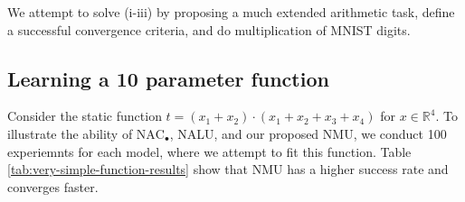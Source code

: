 We attempt to solve (i-iii) by proposing a much extended arithmetic task, define a successful convergence criteria, and do multiplication of MNIST digits.


\subsection{Learning a 10 parameter function}
Consider the static function $t = (x_1 + x_2) \cdot (x_1 + x_2 + x_3 + x_4)$ for $x \in \mathbb{R}^4$. To illustrate the ability of $\mathrm{NAC}_{\bullet}$, NALU, and our proposed NMU, we conduct 100 experiemnts for each model, where we attempt to fit this function. Table \ref{tab:very-simple-function-results} show that NMU has a higher success rate and converges faster.

